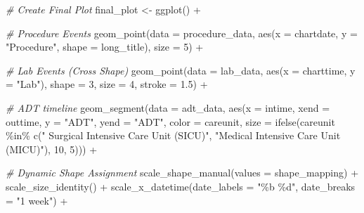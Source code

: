 \documentclass[
]{article}
\newenvironment{Shaded}{\begin{snugshade}}{\end{snugshade}}
\newcommand{\AttributeTok}[1]{\textcolor[rgb]{0.77,0.63,0.00}{#1}}
\newcommand{\CommentTok}[1]{\textcolor[rgb]{0.56,0.35,0.01}{\textit{#1}}}
\newcommand{\DecValTok}[1]{\textcolor[rgb]{0.00,0.00,0.81}{#1}}
\newcommand{\FloatTok}[1]{\textcolor[rgb]{0.00,0.00,0.81}{#1}}
\newcommand{\FunctionTok}[1]{\textcolor[rgb]{0.00,0.00,0.00}{#1}}
\newcommand{\NormalTok}[1]{\textcolor[rgb]{0.00,0.00,0.00}{#1}}
\newcommand{\OtherTok}[1]{\textcolor[rgb]{0.56,0.35,0.01}{#1}}
\newcommand{\SpecialCharTok}[1]{\textcolor[rgb]{0.00,0.00,0.00}{#1}}
\newcommand{\StringTok}[1]{\textcolor[rgb]{0.31,0.60,0.02}{#1}}
\begin{document}
\begin{Shaded}
\begin{Highlighting}[]
\CommentTok{\# Create Final Plot}
\NormalTok{final\_plot }\OtherTok{\textless{}{-}} \FunctionTok{ggplot}\NormalTok{() }\SpecialCharTok{+}
  
  \CommentTok{\# Procedure Events}
  \FunctionTok{geom\_point}\NormalTok{(}\AttributeTok{data =}\NormalTok{ procedure\_data, }\FunctionTok{aes}\NormalTok{(}\AttributeTok{x =}\NormalTok{ chartdate, }
                                        \AttributeTok{y =} \StringTok{"Procedure"}\NormalTok{, }
                                        \AttributeTok{shape =}\NormalTok{ long\_title), }\AttributeTok{size =} \DecValTok{5}\NormalTok{) }\SpecialCharTok{+}
  
  \CommentTok{\# Lab Events (Cross Shape)}
  \FunctionTok{geom\_point}\NormalTok{(}\AttributeTok{data =}\NormalTok{ lab\_data, }\FunctionTok{aes}\NormalTok{(}\AttributeTok{x =}\NormalTok{ charttime, }\AttributeTok{y =} \StringTok{"Lab"}\NormalTok{), }
             \AttributeTok{shape =} \DecValTok{3}\NormalTok{, }\AttributeTok{size =} \DecValTok{4}\NormalTok{, }\AttributeTok{stroke =} \FloatTok{1.5}\NormalTok{) }\SpecialCharTok{+}
  
  \CommentTok{\# ADT timeline}
  \FunctionTok{geom\_segment}\NormalTok{(}\AttributeTok{data =}\NormalTok{ adt\_data, }\FunctionTok{aes}\NormalTok{(}\AttributeTok{x =}\NormalTok{ intime, }\AttributeTok{xend =}\NormalTok{ outtime, }
                                    \AttributeTok{y =} \StringTok{"ADT"}\NormalTok{, }\AttributeTok{yend =} \StringTok{"ADT"}\NormalTok{, }
                                    \AttributeTok{color =}\NormalTok{ careunit, }
                                    \AttributeTok{size =} \FunctionTok{ifelse}\NormalTok{(careunit }\SpecialCharTok{\%in\%} \FunctionTok{c}\NormalTok{(}\StringTok{"}
\StringTok{                                    Surgical Intensive Care Unit (SICU)"}\NormalTok{, }
                                    \StringTok{"Medical Intensive Care Unit (MICU)"}\NormalTok{), }
                                    \DecValTok{10}\NormalTok{, }\DecValTok{5}\NormalTok{))) }\SpecialCharTok{+}

  \CommentTok{\# Dynamic Shape Assignment}
  \FunctionTok{scale\_shape\_manual}\NormalTok{(}\AttributeTok{values =}\NormalTok{ shape\_mapping) }\SpecialCharTok{+}  
  \FunctionTok{scale\_size\_identity}\NormalTok{() }\SpecialCharTok{+}  
  \FunctionTok{scale\_x\_datetime}\NormalTok{(}\AttributeTok{date\_labels =} \StringTok{"\%b \%d"}\NormalTok{, }\AttributeTok{date\_breaks =} \StringTok{"1 week"}\NormalTok{) }\SpecialCharTok{+}  


\end{Highlighting}
\end{Shaded}
\end{document}

